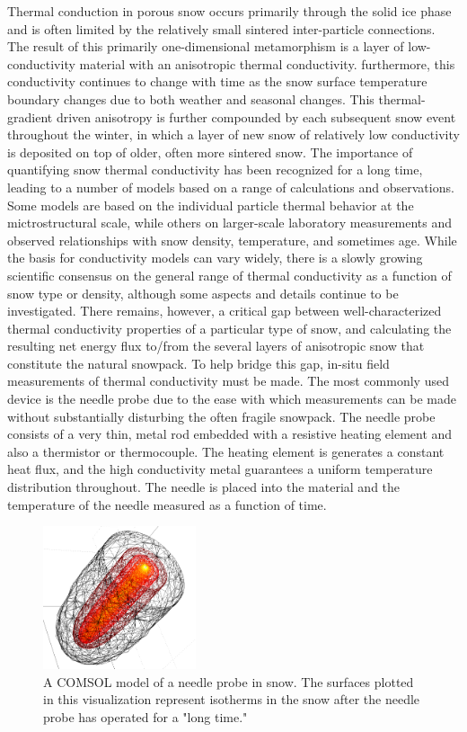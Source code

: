 \documentclass[12pt, letterpaper]{article}
\begin{document}
Thermal conduction in porous snow occurs primarily through the solid ice phase and is often limited by the relatively small sintered inter-particle connections. The result of this primarily one-dimensional metamorphism is a layer of low-conductivity material with an anisotropic thermal conductivity. furthermore, this conductivity continues to change with time as the snow surface temperature boundary changes due to both weather and seasonal changes. This thermal-gradient driven anisotropy is further compounded by each subsequent snow event throughout the winter, in which a layer of new snow of relatively low conductivity is deposited on top of older, often more sintered snow.
The importance of quantifying snow thermal conductivity has been recognized for a long time, leading to a number of models based on a range of calculations and observations. Some models are based on the individual particle thermal behavior at the mictrostructural scale, while others on larger-scale laboratory measurements and observed relationships with snow density, temperature, and sometimes age. While the basis for conductivity models can vary widely, there is a slowly growing scientific consensus on the general range of thermal conductivity as a function of snow type or density, although some aspects and details continue to be investigated.
There remains, however, a critical gap between well-characterized thermal conductivity properties of a particular type of snow, and calculating the resulting net energy flux to/from the several layers of anisotropic snow that constitute the natural snowpack. To help bridge this gap, in-situ field measurements of thermal conductivity must be made. The most commonly used device is the needle probe due to the ease with which measurements can be made without substantially disturbing the often fragile snowpack.
The needle probe consists of a very thin, metal rod embedded with a resistive heating element and also a thermistor or thermocouple. The heating element is generates a constant heat flux, and the high conductivity metal guarantees a uniform temperature distribution throughout. The needle is placed into the material and the temperature of the needle measured as a function of time.

\begin{figure}
\centering
\label{fig:needle_probe}
\includegraphics[width=0.4\textwidth]{isotherms}
\caption{A COMSOL model of a needle probe in snow. The surfaces plotted in this visualization represent isotherms in the snow after the needle probe has operated for a "long time."}
\end{figure}
\end{document}
